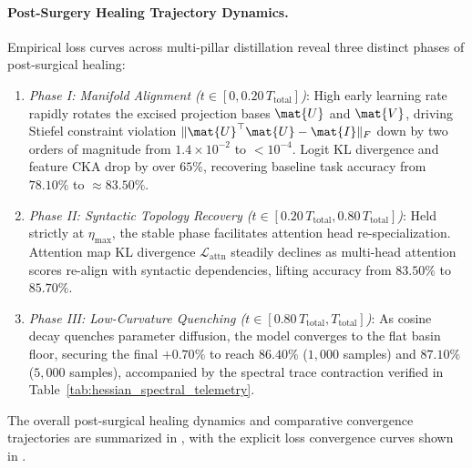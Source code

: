 \paragraph{Post-Surgery Healing Trajectory Dynamics.}
Empirical loss curves across multi-pillar distillation reveal three distinct phases of post-surgical healing:
\begin{enumerate}
    \item \emph{Phase I: Manifold Alignment ($t \in [0, 0.20\, T_{\text{total}}]$)}: High early learning rate rapidly rotates the excised projection bases $\mat{U}$ and $\mat{V}$, driving Stiefel constraint violation $\|\mat{U}^\top \mat{U} - \mat{I}\|_F$ down by two orders of magnitude from $1.4 \times 10^{-2}$ to $<10^{-4}$. Logit KL divergence and feature CKA drop by over $65\%$, recovering baseline task accuracy from $78.10\%$ to $\approx 83.50\%$.
    \item \emph{Phase II: Syntactic Topology Recovery ($t \in [0.20\, T_{\text{total}}, 0.80\, T_{\text{total}}]$)}: Held strictly at $\eta_{\max}$, the stable phase facilitates attention head re-specialization. Attention map KL divergence $\mathcal{L}_{\text{attn}}$ steadily declines as multi-head attention scores re-align with syntactic dependencies, lifting accuracy from $83.50\%$ to $85.70\%$.
    \item \emph{Phase III: Low-Curvature Quenching ($t \in [0.80\, T_{\text{total}}, T_{\text{total}}]$)}: As cosine decay quenches parameter diffusion, the model converges to the flat basin floor, securing the final $+0.70\%$ to reach $86.40\%$ ($1{,}000$ samples) and $87.10\%$ ($5{,}000$ samples), accompanied by the spectral trace contraction verified in Table~\ref{tab:hessian_spectral_telemetry}.
\end{enumerate}
The overall post-surgical healing dynamics and comparative convergence trajectories are summarized in , with the explicit loss convergence curves shown in .

